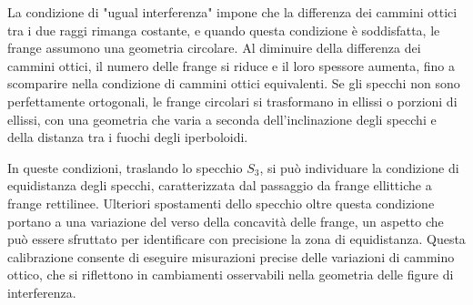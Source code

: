 \documentclass[a4paper,12pt]{article}
\begin{document}
La condizione di "ugual interferenza" impone che la differenza dei cammini ottici tra i due raggi rimanga costante, e quando questa condizione è soddisfatta, le frange assumono una geometria circolare. Al diminuire della differenza dei cammini ottici, il numero delle frange si riduce e il loro spessore aumenta, fino a scomparire nella condizione di cammini ottici equivalenti. Se gli specchi non sono perfettamente ortogonali, le frange circolari si trasformano in ellissi o porzioni di ellissi, con una geometria che varia a seconda dell'inclinazione degli specchi e della distanza tra i fuochi degli iperboloidi. 

In queste condizioni, traslando lo specchio \(S_3\), si può individuare la condizione di equidistanza degli specchi, caratterizzata dal passaggio da frange ellittiche a frange rettilinee. Ulteriori spostamenti dello specchio oltre questa condizione portano a una variazione del verso della concavità delle frange, un aspetto che può essere sfruttato per identificare con precisione la zona di equidistanza. Questa calibrazione consente di eseguire misurazioni precise delle variazioni di cammino ottico, che si riflettono in cambiamenti osservabili nella geometria delle figure di interferenza.
\end{document}

